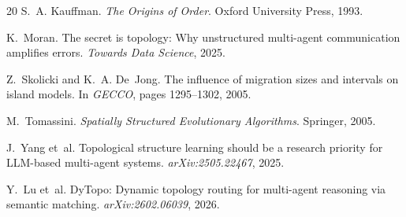 \documentclass[10pt,twocolumn]{article}
\begin{document}
\begin{thebibliography}{20}
S.~A. Kauffman.
\newblock \emph{The Origins of Order}.
\newblock Oxford University Press, 1993.

K.~Moran.
\newblock The secret is topology: Why unstructured multi-agent communication
  amplifies errors.
\newblock \emph{Towards Data Science}, 2025.

Z.~Skolicki and K.~A. De~Jong.
\newblock The influence of migration sizes and intervals on island models.
\newblock In \emph{GECCO}, pages 1295--1302, 2005.

M.~Tomassini.
\newblock \emph{Spatially Structured Evolutionary Algorithms}.
\newblock Springer, 2005.

J.~Yang et~al.
\newblock Topological structure learning should be a research priority for
  {LLM}-based multi-agent systems.
\newblock \emph{arXiv:2505.22467}, 2025.

Y.~Lu et~al.
\newblock DyTopo: Dynamic topology routing for multi-agent reasoning via
  semantic matching.
\newblock \emph{arXiv:2602.06039}, 2026.

\end{thebibliography}
\end{document}
